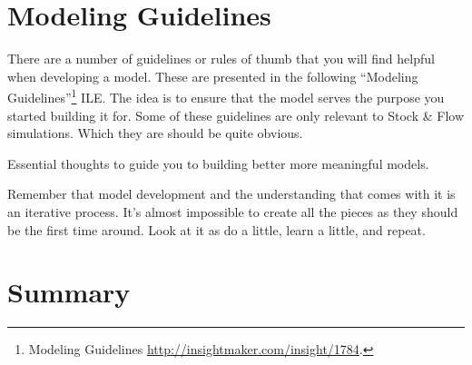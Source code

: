 \documentclass[]{memoir}
\begin{document}
\section{Modeling Guidelines}

There are a number of guidelines or rules of thumb that you will find
helpful when developing a model. These are presented in the following
``Modeling Guidelines''\footnote{Modeling Guidelines
  \url{http://insightmaker.com/insight/1784}.} ILE. The idea is to
ensure that the model serves the purpose you started building it for.
Some of these guidelines are only relevant to Stock \& Flow simulations.
Which they are should be quite obvious.

\FloatBarrier 

\begin{model}[frametitle={Model: Modeling Guidelines}] 

 Essential thoughts to guide you to building better more meaningful models.




 \end{model}

Remember that model development and the understanding that comes with it
is an iterative process. It's almost impossible to create all the pieces
as they should be the first time around. Look at it as do a little,
learn a little, and repeat.

\section{Summary}
\end{document}
